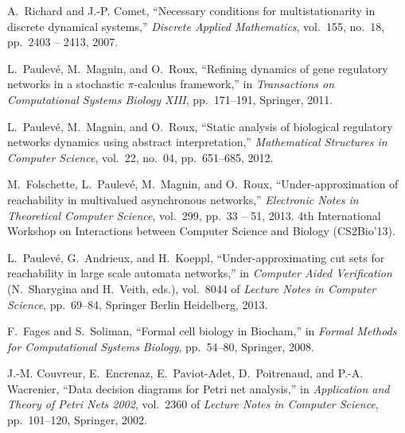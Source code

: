 \documentclass{movep}
\newcounter{la}
\begin{document}
%
%

\begin{thebibliography}{1}

A.~Richard and J.-P. Comet, ``Necessary conditions for multistationarity in
  discrete dynamical systems,'' {\em Discrete Applied Mathematics}, vol.~155,
  no.~18, pp.~2403 -- 2413, 2007.

L.~{P}aulev{\'e}, M.~{M}agnin, and O.~{R}oux, ``Refining dynamics of gene
  regulatory networks in a stochastic $\pi$-calculus framework,'' in {\em
  Transactions on Computational Systems Biology XIII}, pp.~171--191, Springer,
  2011.

L.~Paulev\'{e}, M.~Magnin, and O.~Roux, ``Static analysis of biological
  regulatory networks dynamics using abstract interpretation,'' {\em
  Mathematical Structures in Computer Science}, vol.~22, no.~04, pp.~651--685,
  2012.

M.~Folschette, L.~Paulev{\'e}, M.~Magnin, and O.~Roux, ``Under-approximation of
  reachability in multivalued asynchronous networks,'' {\em Electronic Notes in
  Theoretical Computer Science}, vol.~299, pp.~33 -- 51, 2013.
\newblock 4th International Workshop on Interactions between Computer Science
  and Biology (CS2Bio'13).

L.~Paulev{\'e}, G.~Andrieux, and H.~Koeppl, ``Under-approximating cut sets for
  reachability in large scale automata networks,'' in {\em Computer Aided
  Verification} (N.~Sharygina and H.~Veith, eds.), vol.~8044 of {\em Lecture
  Notes in Computer Science}, pp.~69--84, Springer Berlin Heidelberg, 2013.

F.~Fages and S.~Soliman, ``Formal cell biology in {B}iocham,'' in {\em Formal
  Methods for Computational Systems Biology}, pp.~54--80, Springer, 2008.

J.-M. Couvreur, E.~Encrenaz, E.~Paviot-Adet, D.~Poitrenaud, and P.-A.
  Wacrenier, ``Data decision diagrams for {P}etri net analysis,'' in {\em
  Application and Theory of Petri Nets 2002}, vol.~2360 of {\em Lecture Notes
  in Computer Science}, pp.~101--120, Springer, 2002.

\end{thebibliography}
\end{document}
